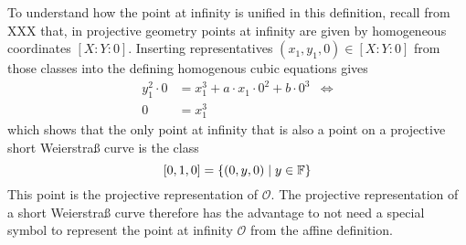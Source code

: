 To understand how the point at infinity is unified in this definition, recall from XXX that, in projective geometry points at infinity are given by homogeneous coordinates $[X:Y:0]$. Inserting representatives $(x_1,y_1,0)\in [X:Y:0]$ from those classes into the defining homogenous cubic equations gives
\begin{align*}
y_1^2\cdot 0 & = x_1^3+a\cdot x_1\cdot 0^2 + b\cdot 0^3 & \Leftrightarrow \\
0 & = x_1^3
\end{align*} 
which shows that the only point at infinity that is also a point on a projective short Weierstraß curve is the class 
$$
[0,1,0] = \{(0,y,0)\;|\; y\in \mathbb{F}\}
$$
This point is the projective representation of $\mathcal{O}$. The projective representation of a short Weierstraß curve therefore has the advantage to not need a special symbol to represent the point at infinity $\mathcal{O}$ from the affine definition.
